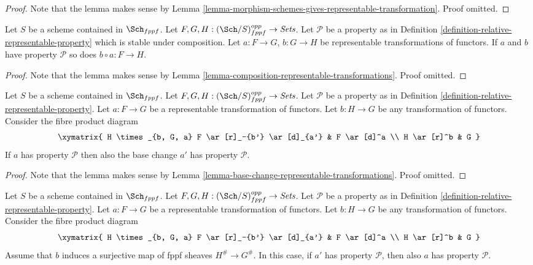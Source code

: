 \begin{proof}
Note that the lemma makes sense by
Lemma \ref{lemma-morphism-schemes-gives-representable-transformation}.
Proof omitted.
\end{proof}

\begin{lemma}
\label{lemma-composition-representable-transformations-property}
Let $S$ be a scheme contained in $\Sch_{fppf}$.
Let $F, G, H : (\Sch/S)_{fppf}^{opp} \to \textit{Sets}$.
Let $\mathcal{P}$ be a property as in
Definition \ref{definition-relative-representable-property}
which is stable under composition.
Let $a : F \to G$, $b : G \to H$ be representable transformations of functors.
If $a$ and $b$ have property $\mathcal{P}$ so does
$b \circ a : F \longrightarrow H$.
\end{lemma}

\begin{proof}
Note that the lemma makes sense by
Lemma \ref{lemma-composition-representable-transformations}.
Proof omitted.
\end{proof}

\begin{lemma}
\label{lemma-base-change-representable-transformations-property}
Let $S$ be a scheme contained in $\Sch_{fppf}$.
Let $F, G, H : (\Sch/S)_{fppf}^{opp} \to \textit{Sets}$.
Let $\mathcal{P}$ be a property as in
Definition \ref{definition-relative-representable-property}.
Let $a : F \to G$ be a representable transformation of functors.
Let $b : H \to G$ be any transformation of functors.
Consider the fibre product diagram
$$
\xymatrix{
H \times_{b, G, a} F \ar[r]_-{b'} \ar[d]_{a'} & F \ar[d]^a \\
H \ar[r]^b & G
}
$$
If $a$ has property $\mathcal{P}$ then also the base change $a'$
has property $\mathcal{P}$.
\end{lemma}

\begin{proof}
Note that the lemma makes sense by
Lemma \ref{lemma-base-change-representable-transformations}.
Proof omitted.
\end{proof}

\begin{lemma}
\label{lemma-descent-representable-transformations-property}
Let $S$ be a scheme contained in $\Sch_{fppf}$.
Let $F, G, H : (\Sch/S)_{fppf}^{opp} \to \textit{Sets}$.
Let $\mathcal{P}$ be a property as in
Definition \ref{definition-relative-representable-property}.
Let $a : F \to G$ be a representable transformation of functors.
Let $b : H \to G$ be any transformation of functors.
Consider the fibre product diagram
$$
\xymatrix{
H \times_{b, G, a} F \ar[r]_-{b'} \ar[d]_{a'} & F \ar[d]^a \\
H \ar[r]^b & G
}
$$
Assume that $b$ induces a surjective map of fppf sheaves $H^\# \to G^\#$.
In this case, if $a'$ has property $\mathcal{P}$, then also $a$
has property $\mathcal{P}$.
\end{lemma}

